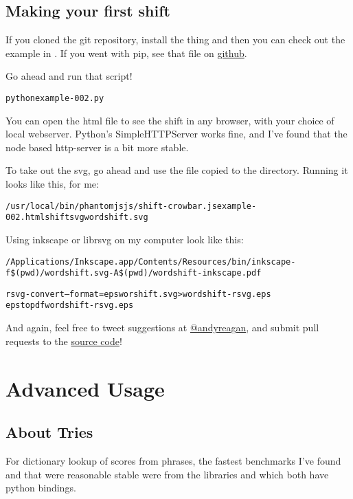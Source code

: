 \documentclass[letterpaper,10pt,english]{sphinxmanual}
\begin{document}
\section{Making your first shift}
\label{wordshifts:making-your-first-shift}
If you cloned the git repository, install the thing and then you can check out the example in .
If you went with pip, see that file on \href{https://github.com/andyreagan/labMT-simple/blob/master/examples/example.py}{github}.

Go ahead and run that script!
\begin{alltt}
python example-002.py
\end{alltt}

You can open the html file to see the shift in any browser, with your choice of local webserver.
Python's SimpleHTTPServer works fine, and I've found that the node based http-server is a bit more stable.

To take out the svg, go ahead and use the  file copied to the  directory.
Running it looks like this, for me:
\begin{alltt}
/usr/local/bin/phantomjs js/shift-crowbar.js example-002.html shiftsvg wordshift.svg
\end{alltt}

Using inkscape or librsvg on my computer look like this:
\begin{alltt}
/Applications/Inkscape.app/Contents/Resources/bin/inkscape -f \$(pwd)/wordshift.svg -A \$(pwd)/wordshift-inkscape.pdf

rsvg-convert --format=eps worshift.svg \textgreater{} wordshift-rsvg.eps
epstopdf wordshift-rsvg.eps
\end{alltt}

And again, feel free to tweet suggestions at \href{https://twitter.com/andyreagan}{@andyreagan}, and submit pull requests to the \href{https://github.com/andyreagan/labMT-simple}{source code}!


\chapter{Advanced Usage}
\label{advanced::doc}\label{advanced:advanced-usage}

\section{About Tries}
\label{advanced:about-tries}
For dictionary lookup of scores from phrases, the fastest benchmarks I've found and that were reasonable stable were from the libraries  and  which both have python bindings.
\end{document}
